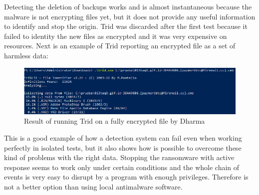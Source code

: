 \linej
\linej
Detecting the deletion of backups works and is almost instantaneous because the malware is not encrypting files yet, but it does not provide any useful information to identify and stop the origin.
\linej
\linej
Trid was discarded after the first test because it failed to identity the new files as encrypted and it was very expensive on resources.
Next is an example of Trid reporting an encrypted file as a set of harmless data:
\begin{figure}[H]
	\centering
	\includegraphics[width=\textwidth]{figuras/Trid_Dharma.png}
	\caption{Result of running Trid on a fully encrypted file by Dharma}
\end{figure}
\linej
This is a good example of how a detection system can fail even when working perfectly in isolated tests, but it also shows how is possible to overcome these kind of problems with the right data.
Stopping the ransomware with active response seems to work only under certain conditions and the whole chain of events is very easy to disrupt by a program with enough privileges.
Therefore is not a better option than using local antimalware software.

